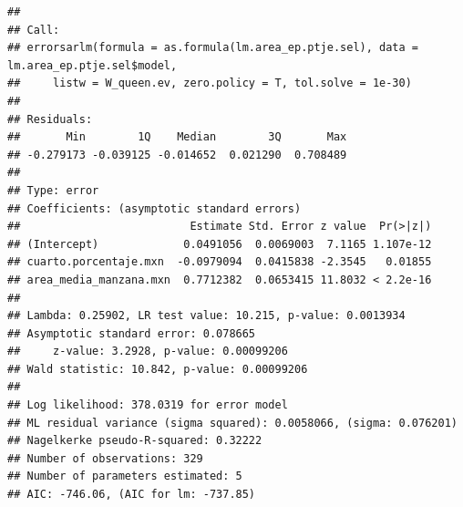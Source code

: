 \documentclass[12pt,]{book}
\newenvironment{Shaded}{\begin{snugshade}}{\end{snugshade}}
\newcommand{\KeywordTok}[1]{\textcolor[rgb]{0.13,0.29,0.53}{\textbf{#1}}}
\newcommand{\DataTypeTok}[1]{\textcolor[rgb]{0.13,0.29,0.53}{#1}}
\newcommand{\FloatTok}[1]{\textcolor[rgb]{0.00,0.00,0.81}{#1}}
\newcommand{\StringTok}[1]{\textcolor[rgb]{0.31,0.60,0.02}{#1}}
\newcommand{\CommentTok}[1]{\textcolor[rgb]{0.56,0.35,0.01}{\textit{#1}}}
\newcommand{\OperatorTok}[1]{\textcolor[rgb]{0.81,0.36,0.00}{\textbf{#1}}}
\newcommand{\NormalTok}[1]{#1}
\begin{document}
\begin{verbatim}
## 
## Call:
## errorsarlm(formula = as.formula(lm.area_ep.ptje.sel), data = lm.area_ep.ptje.sel$model, 
##     listw = W_queen.ev, zero.policy = T, tol.solve = 1e-30)
## 
## Residuals:
##       Min        1Q    Median        3Q       Max 
## -0.279173 -0.039125 -0.014652  0.021290  0.708489 
## 
## Type: error 
## Coefficients: (asymptotic standard errors) 
##                          Estimate Std. Error z value  Pr(>|z|)
## (Intercept)             0.0491056  0.0069003  7.1165 1.107e-12
## cuarto.porcentaje.mxn  -0.0979094  0.0415838 -2.3545   0.01855
## area_media_manzana.mxn  0.7712382  0.0653415 11.8032 < 2.2e-16
## 
## Lambda: 0.25902, LR test value: 10.215, p-value: 0.0013934
## Asymptotic standard error: 0.078665
##     z-value: 3.2928, p-value: 0.00099206
## Wald statistic: 10.842, p-value: 0.00099206
## 
## Log likelihood: 378.0319 for error model
## ML residual variance (sigma squared): 0.0058066, (sigma: 0.076201)
## Nagelkerke pseudo-R-squared: 0.32222 
## Number of observations: 329 
## Number of parameters estimated: 5 
## AIC: -746.06, (AIC for lm: -737.85)
\end{verbatim}

\begin{Shaded}
\end{Shaded}
\end{document}
